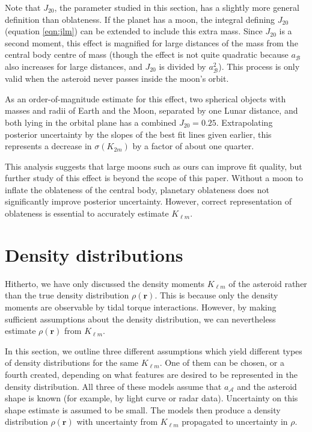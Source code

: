 \documentclass[fleqn,usenatbib]{mnras}
\begin{document}
Note that $J_{20}$, the parameter studied in this section, has a slightly more general definition than oblateness. If the planet has a moon, the integral defining $J_{20}$ (equation \ref{eqn:jlm}) can be extended to include this extra mass. Since $J_{20}$ is a second moment, this effect is magnified for large distances of the mass from the central body centre of mass (though the effect is not quite quadratic because $a_\mathcal{B}$ also increases for large distances, and $J_{20}$ is divided by $a_\mathcal{B}^2$). This process is only valid when the asteroid never passes inside the moon's orbit.

As an order-of-magnitude estimate for this effect, two spherical objects with masses and radii of Earth and the Moon, separated by one Lunar distance, and both lying in the orbital plane has a combined $J_{20} = 0.25$. Extrapolating posterior uncertainty by the slopes of the best fit lines given earlier, this represents a decrease in $\sigma(K_{2m})$ by a factor of about one quarter.

This analysis suggests that large moons such as ours can improve fit quality, but further study of this effect is beyond the scope of this paper. Without a moon to inflate the oblateness of the central body, planetary oblateness does not significantly improve posterior uncertainty. However, correct representation of oblateness is essential to accurately estimate $K_{\ell m}$.



\section{Density distributions}
\label{sec:distros}

Hitherto, we have only discussed the density moments $K_{\ell m}$ of the asteroid rather than the true density distribution $\rho(\bm r)$. This is because only the density moments are observable by tidal torque interactions. However, by making sufficient assumptions about the density distribution, we can nevertheless estimate $\rho(\bm r)$ from $K_{\ell m}$.

In this section, we outline three different assumptions which yield different types of density distributions for the same $K_{\ell m}$. One of them can be chosen, or a fourth created, depending on what features are desired to be represented in the density distribution. All three of these models assume that $a_\mathcal{A}$ and the asteroid shape is known (for example, by light curve or radar data). Uncertainty on this shape estimate is assumed to be small. The models then produce a density distribution $\rho(\bm r)$ with uncertainty from $K_{\ell m}$ propagated to uncertainty in $\rho$.
\end{document}
